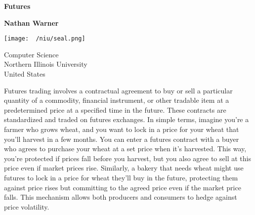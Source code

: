 \documentclass{report}
\title{\Huge{}}
\author{\huge{Nathan Warner}}
\date{\huge{}}
\begin{document}
        \begin{titlepage}
       \begin{center}
           \vspace*{1cm}
    
           \textbf{Futures}
    
           \vspace{0.5cm}
            
                
           \vspace{1.5cm}
    
           \textbf{Nathan Warner}
    
           \vfill
                
                
           \vspace{0.8cm}
         
           \texttt{[image: ~/niu/seal.png]}
                
           Computer Science \\
           Northern Illinois University\\
           United States\\
           
                
       \end{center}
    \end{titlepage}
    \tableofcontents
    \pagebreak 
    \bigbreak \noindent 
    \begin{concept}
        Futures trading involves a contractual agreement to buy or sell a particular quantity of a commodity, financial instrument, or other tradable item at a predetermined price at a specified time in the future. These contracts are standardized and traded on futures exchanges.
        \bigbreak \noindent 
        In simple terms, imagine you're a farmer who grows wheat, and you want to lock in a price for your wheat that you'll harvest in a few months. You can enter a futures contract with a buyer who agrees to purchase your wheat at a set price when it's harvested. This way, you're protected if prices fall before you harvest, but you also agree to sell at this price even if market prices rise. Similarly, a bakery that needs wheat might use futures to lock in a price for wheat they'll buy in the future, protecting them against price rises but committing to the agreed price even if the market price falls. This mechanism allows both producers and consumers to hedge against price volatility.
    \end{concept}

    \bigbreak \noindent 
    
\end{document}
